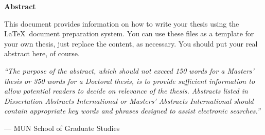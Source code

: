 \begin{center}
\textbf{\large Abstract}
\end{center}

This document provides information on how to write your thesis using
the \LaTeX\ document preparation system.  You can use these files as a
template for your own thesis, just replace the content, as necessary.
You should put your real abstract here, of course.

\vspace{1cm}

\emph{``The purpose of the abstract, which should not exceed 150 words for
a Masters' thesis or 350 words for a Doctoral thesis, is to provide
sufficient information to allow potential readers to decide on relevance
of the thesis. Abstracts listed in Dissertation Abstracts International
or Masters' Abstracts International should contain appropriate key
words and phrases designed to assist electronic searches.''}

\hfill --- MUN School of Graduate Studies
